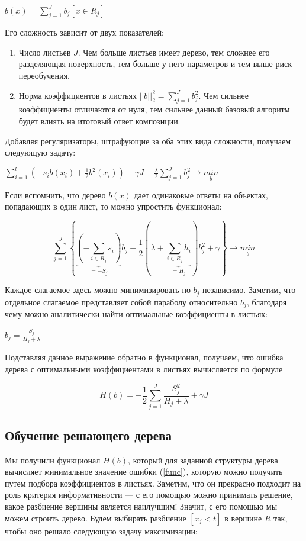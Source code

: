 \documentclass{article}
\theoremstyle{definition}
\theoremstyle{theorem}
\theoremstyle{remark}
\theoremstyle{theorem}
\theoremstyle{example}
\theoremstyle{theorem}
\theoremstyle{theorem}
\theoremstyle{theorem}
\theoremstyle{theorem}
\begin{document}
$b(x) = \sum\limits_{j=1}^{J} b_j  \left[x \in R_j \right]$

Его сложность зависит от двух показателей:

\begin{enumerate}
	\item Число листьев $J$. Чем больше листьев имеет дерево, тем сложнее его разделяющая поверхность, тем больше у него параметров и тем выше риск переобучения.
	\item Норма коэффициентов в листьях $\left| \left| b \right| \right| ^2_2 = \sum_{j=1}^{J} b^2_j$. Чем сильнее коэффициенты 	отличаются от нуля, тем сильнее данный базовый алгоритм будет влиять на
	итоговый ответ композиции.
\end{enumerate}

Добавляя регуляризаторы, штрафующие за оба этих вида сложности, получаем следующую задачу:

$\sum\limits_{i=1}^{l} (-s_i b(x_i) + \frac{1}{2} b^2(x_i)) + \gamma J + \frac{\lambda}{2}\sum\limits_{j=1}^{J}b^2_j \rightarrow \underset{b}{min}$

Если вспомнить, что дерево $b(x)$ дает одинаковые ответы на объектах, попадающих в один лист, то можно упростить функционал:

$$\sum\limits_{j=1}^{J} \left\{\underbrace{\left(-\sum\limits_{i\in R_j} s_i\right)}_{=-S_j}b_j + \frac{1}{2} 
\left(\lambda + \underbrace{\sum\limits_{i\in R_j} h_i}_{=H_j}\right)b^2_j + \gamma\right\} \rightarrow \underset{b}{min}$$

Каждое слагаемое здесь можно минимизировать по $b_j$ независимо. Заметим, что отдельное слагаемое представляет собой параболу относительно $b_j$, благодаря чему можно аналитически найти оптимальные коэффициенты в листьях:

$b_j = \frac{S_j}{H_j + \lambda}$

Подставляя данное выражение обратно в функционал, получаем, что ошибка дерева с оптимальными коэффициентами в листьях вычисляется по формуле

\begin{equation}
	H(b) = -\frac{1}{2} \sum\limits_{j=1}^{J} \frac{S^2_j}{H_j + \lambda} + \gamma J
\end{equation}

\subsection{ Обучение решающего дерева}

Мы получили функционал $H(b)$, который для заданной структуры дерева вычисляет минимальное значение ошибки (\ref{func}), которую можно получить путем подбора коэффициентов в листьях. Заметим, что он прекрасно подходит на роль критерия информативности — с его помощью можно принимать решение, какое разбиение вершины является наилучшим! Значит, с его помощью мы можем строить дерево. Будем
выбирать разбиение $[x_j < t]$ в вершине $R$ так, чтобы оно решало следующую задачу
максимизации:
\end{document}
